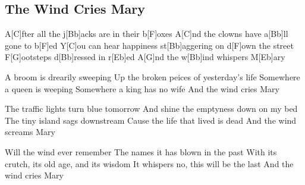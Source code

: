 \subsection*{The Wind Cries Mary   }
\begin{guitar}
A[C]fter all the j[Bb]acks are in their b[F]oxes
A[C]nd the clowns have a[Bb]ll gone to b[F]ed
Y[C]ou can hear happiness st[Bb]aggering on d[F]own the street
F[G]ootsteps d[Bb]ressed in r[Eb]ed
A[G]nd the w[Bb]ind whispers M[Eb]ary



A broom is drearily sweeping
Up the broken peices of yesterday's life
Somewhere a queen is weeping
Somewhere a king has no wife
And the wind cries Mary



The traffic lights turn blue tomorrow
And shine the emptyness down on my bed
The tiny island sags downstream
Cause the life that lived is dead
And the wind screams Mary



Will the wind ever remember
The names it has blown in the past
With its crutch, its old age, and its wisdom
It whispers no, this will be the last
And the wind cries Mary
\end{guitar}
